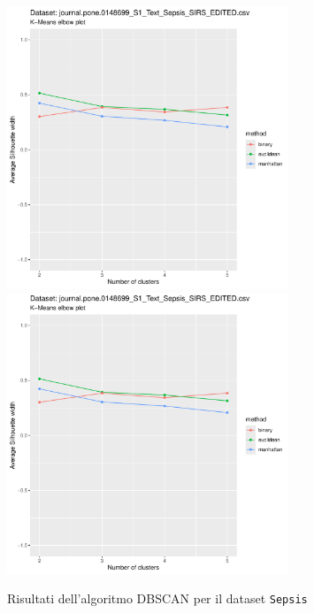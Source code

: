 \documentclass[a4paper, 12pt]{report}
\begin{document}
			\begin{figure}[H]
				\centering
				\includegraphics[width = 0.75\textwidth, height = 0.45\textheight, page = 5]{
					results/results_Sepsis.csv.pdf
				}
				\includegraphics[width = 0.75\textwidth, height = 0.45\textheight, page = 6]{
					results/results_Sepsis.csv.pdf
				}
				\caption{Risultati dell'algoritmo DBSCAN per il dataset
				\texttt{Sepsis}}
				\label{fig:dbscan5}
			\end{figure}
\end{document}
